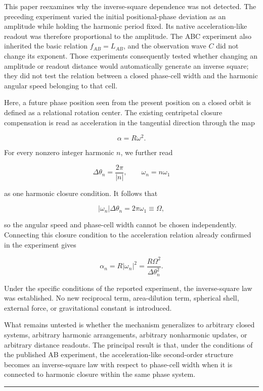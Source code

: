 \documentclass[
  10pt,
  a4paper,
]{article}
\begin{document}
This paper reexamines why the inverse-square dependence was not
detected. The preceding experiment varied the initial positional-phase
deviation as an amplitude while holding the harmonic period fixed. Its
native acceleration-like readout was therefore proportional to the
amplitude. The ABC experiment also inherited the basic relation
\(f_{AB}=L_{AB}\), and the observation wave \(C\) did not change its
exponent. Those experiments consequently tested whether changing an
amplitude or readout distance would automatically generate an inverse
square; they did not test the relation between a closed phase-cell width
and the harmonic angular speed belonging to that cell.

Here, a future phase position seen from the present position on a closed
orbit is defined as a relational rotation center. The existing
centripetal closure compensation is read as acceleration in the
tangential direction through the map

\[
\alpha=R\omega^2.
\]

For every nonzero integer harmonic \(n\), we further read

\[
\Delta\theta_n=\frac{2\pi}{|n|},
\qquad
\omega_n=n\omega_1
\]

as one harmonic closure condition. It follows that

\[
|\omega_n|\Delta\theta_n
=2\pi\omega_1
\equiv\Omega,
\]

so the angular speed and phase-cell width cannot be chosen
independently. Connecting this closure condition to the acceleration
relation already confirmed in the experiment gives

\[
\alpha_n
=R|\omega_n|^2
=\frac{R\Omega^2}{\Delta\theta_n^2}.
\]

Under the specific conditions of the reported experiment, the
inverse-square law was established. No new reciprocal term,
area-dilution term, spherical shell, external force, or gravitational
constant is introduced.

What remains untested is whether the mechanism generalizes to arbitrary
closed systems, arbitrary harmonic arrangements, arbitrary nonharmonic
updates, or arbitrary distance readouts. The principal result is that,
under the conditions of the published AB experiment, the
acceleration-like second-order structure becomes an inverse-square law
with respect to phase-cell width when it is connected to harmonic
closure within the same phase system.

\begin{center}\rule{0.5\linewidth}{0.5pt}\end{center}
\end{document}
